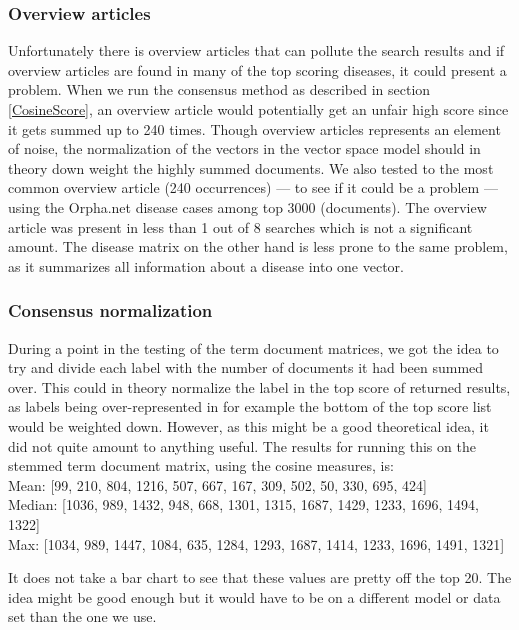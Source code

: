 \subsubsection{Overview articles}
Unfortunately there is overview articles that can pollute the search
results and if overview articles are found in many of the top scoring
diseases, it could present a problem. When we run the consensus method
as described in section \ref{CosineScore}, an overview article would
potentially get an unfair high score since it gets summed up to 240
times. Though overview articles represents an element of noise, the
normalization of the vectors in the vector space model should in
theory down weight the highly summed documents. We also tested to the
most common overview article (240 occurrences) --- to see if it could
be a problem --- using the Orpha.net disease cases among top 3000
(documents). The overview article was present in less than 1 out of 8
searches which is not a significant amount. The disease matrix on the
other hand is less prone to the same problem, as it summarizes all
information about a disease into one vector.

\subsubsection{Consensus normalization}
During a point in the testing of the term document matrices, we got
the idea to try and divide each label with the number of documents it
had been summed over. This could in theory normalize the label in the
top score of returned results, as labels being over-represented in for
example the bottom of the top score list would be weighted down.
However, as this might be a good theoretical idea, it did not quite
amount to anything useful. The results for running this on the stemmed
term document matrix, using the cosine measures, is:\\

{\small
\noindent Mean: [99, 210, 804, 1216, 507, 667, 167, 309, 502, 50, 330, 695, 424] \\
Median: [1036, 989, 1432, 948, 668, 1301, 1315, 1687, 1429, 1233, 1696, 1494, 1322] \\
Max: [1034, 989, 1447, 1084, 635, 1284, 1293, 1687, 1414, 1233, 1696, 1491, 1321] \\
}

It does not take a bar chart to see that these values are pretty off
the top 20. The idea might be good enough but it would have to be on a
different model or data set than the one we use.

